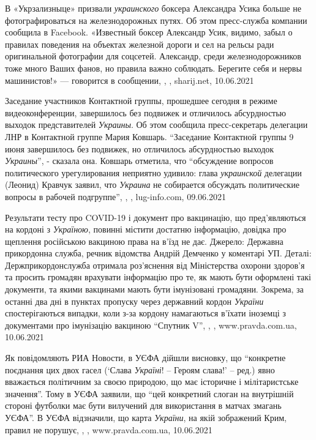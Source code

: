 В «Укрзализныце» призвали \emph{украинского} боксера Александра Усика больше не
фотографироваться на железнодорожных путях. Об этом пресс-служба компании
сообщила в Facebook.  «Известный боксер Александр Усик, видимо, забыл о
правилах поведения на объектах железной дороги и сел на рельсы ради
оригинальной фотографии для соцсетей. Александр, среди железнодорожников тоже
много Ваших фанов, но правила важно соблюдать. Берегите себя и нервы
машинистов!» — говорится в сообщении,
, , sharij.net, 10.06.2021

Заседание участников Контактной группы, прошедшее сегодня в режиме
видеоконференции, завершилось без подвижек и отличилось абсурдностью выходок
представителей \emph{Украины}. Об этом сообщила пресс-секретарь делегации ЛНР в
Контактной группе Мария Ковшарь.  \enquote{Заседание Контактной группы 9 июня
завершилось без подвижек, но отличилось абсурдностью выходок \emph{Украины}}, -
сказала она.  Ковшарь отметила, что \enquote{обсуждение вопросов политического
урегулирования неприятно удивило: глава \emph{украинской} делегации (Леонид)
Кравчук заявил, что \emph{Украина} не собирается обсуждать политические вопросы
в рабочей подгруппе},
, , lug-info.com,
09.06.2021

Результати тесту про COVID-19 і документ про вакцинацію, що пред'являються на
кордоні з \emph{Україною}, повинні містити достатню інформацію, довідка про
щеплення російською вакциною права на в'їзд не дає. Джерело: Державна
прикордонна служба, речник відомства Андрій Демченко у коментарі УП.  Деталі:
Держприкордонслужба отримала роз'яснення від Міністерства охорони здоров'я та
просить громадян врахувати інформацію про те, як мають бути оформлені такі
документи, та якими вакцинами мають бути імунізовані громадяни.  Зокрема, за
останні два дні в пунктах пропуску через державний кордон \emph{України}
спостерігаються випадки, коли з-за кордону  намагаються в'їхати іноземці з
документами про імунізацію вакциною \enquote{Спутник V},
, , www.pravda.com.ua, 10.06.2021

Як повідомляють РИА Новости, в УЄФА дійшли висновку, що \enquote{конкретне поєднання
цих двох гасел (\enquote{Слава \emph{Україні}! – Героям слава!} – ред.) явно вважається
політичним за своєю природою, що має історичне і мілітаристське значення}.
Тому в УЄФА заявили, що \enquote{цей конкретний слоган на внутрішній стороні футболки
має бути вилучений для використання в матчах змагань УЄФА}. В УЄФА відзначили,
що карта \emph{України}, на якій зображений Крим, правил не порушує,
, , www.pravda.com.ua, 10.06.2021

